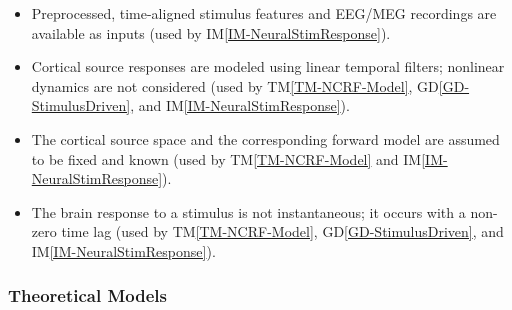 \documentclass[12pt]{article}
\newcommand{\dref}[1]{GD\ref{#1}}
\newcommand{\tref}[1]{TM\ref{#1}}
\newcounter{assumpnum} %
\newcommand{\iref}[1]{IM\ref{#1}}
\begin{document}
\begin{itemize}


  \item[A\refstepcounter{assumpnum}\theassumpnum \label{A1}:]
  Preprocessed, time-aligned stimulus features and EEG/MEG recordings are available as inputs (used by \iref{IM-NeuralStimResponse}).

  \item[A\refstepcounter{assumpnum}\theassumpnum \label{A2}:]
  Cortical source responses are modeled using linear temporal filters; nonlinear dynamics are not considered (used by \tref{TM-NCRF-Model}, \dref{GD-StimulusDriven}, and \iref{IM-NeuralStimResponse}).

  \item[A\refstepcounter{assumpnum}\theassumpnum \label{A3}:]
  The cortical source space and the corresponding forward model are assumed to be fixed and known (used by \tref{TM-NCRF-Model} and \iref{IM-NeuralStimResponse}).

  \item[A\refstepcounter{assumpnum}\theassumpnum \label{A4}:]
  The brain response to a stimulus is not instantaneous; it occurs with a non-zero time lag (used by \tref{TM-NCRF-Model}, \dref{GD-StimulusDriven}, and \iref{IM-NeuralStimResponse}).
\end{itemize}

\subsubsection{Theoretical Models}\label{sec-theoretical}


\end{document}

